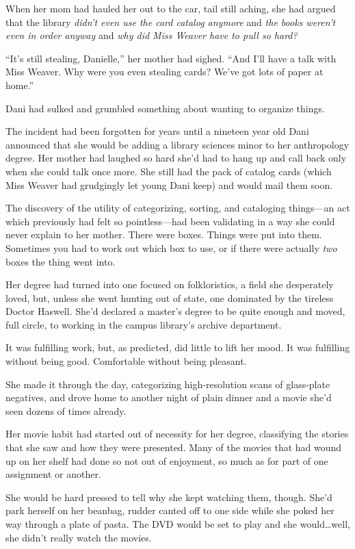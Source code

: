When her mom had hauled her out to the car, tail still aching, she had argued that the library \emph{didn't even use the card catalog anymore} and \emph{the books weren't even in order anyway} and \emph{why did Miss Weaver have to pull so hard?}

``It's still stealing, Danielle,'' her mother had sighed. ``And I'll have a talk with Miss Weaver. Why were you even stealing cards? We've got lots of paper at home.''

Dani had sulked and grumbled something about wanting to organize things.

The incident had been forgotten for years until a nineteen year old Dani announced that she would be adding a library sciences minor to her anthropology degree. Her mother had laughed so hard she'd had to hang up and call back only when she could talk once more. She still had the pack of catalog cards (which Miss Weaver had grudgingly let young Dani keep) and would mail them soon.

The discovery of the utility of categorizing, sorting, and cataloging things---an act which previously had felt so pointless---had been validating in a way she could never explain to her mother. There were boxes. Things were put into them. Sometimes you had to work out which box to use, or if there were actually \emph{two} boxes the thing went into.

Her degree had turned into one focused on folkloristics, a field she desperately loved, but, unless she went hunting out of state, one dominated by the tireless Doctor Haswell. She'd declared a master's degree to be quite enough and moved, full circle, to working in the campus library's archive department.

It was fulfilling work, but, as predicted, did little to lift her mood. It was fulfilling without being good. Comfortable without being pleasant.

She made it through the day, categorizing high-resolution scans of glass-plate negatives, and drove home to another night of plain dinner and a movie she'd seen dozens of times already.

Her movie habit had started out of necessity for her degree, classifying the stories that she saw and how they were presented. Many of the movies that had wound up on her shelf had done so not out of enjoyment, so much as for part of one assignment or another.

She would be hard pressed to tell why she kept watching them, though. She'd park herself on her beanbag, rudder canted off to one side while she poked her way through a plate of pasta. The DVD would be set to play and she would\ldots{}well, she didn't really watch the movies.


